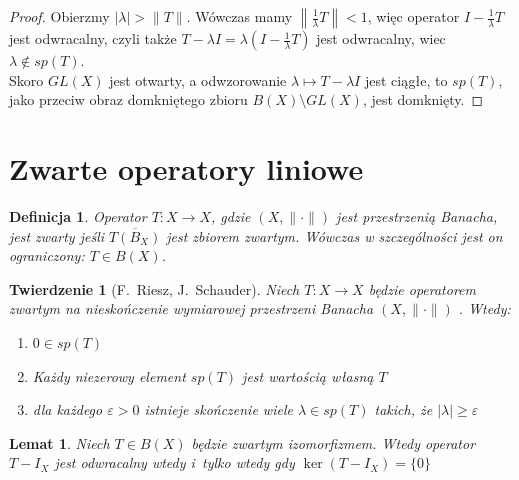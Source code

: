 \documentclass[11pt]{mwrep}
\renewcommand{\[}{\begin{equation}}
\renewcommand{\]}{\end{equation}}
\newcommand{\norm}{\|\cdot\|}
\newcommand{\spac}[1][X]{$(#1,\norm)$ }
\newtheorem{twr}[subsection]{Twierdzenie}%
\newtheorem{lem}[subsection]{Lemat}
\newtheorem{de}[subsection]{Definicja}
\newcounter{numer}
\begin{document}
\begin{proof}
	Obierzmy $|\lambda| >\|T\|$. Wówczas mamy $\left\| \frac{1}{\lambda} T\right\|<1$, więc operator  $I- \frac{1}{\lambda}T$ jest odwracalny, czyli
	także $T - \lambda I = \lambda\left( I -\frac{1}{\lambda}T \right)$ jest odwracalny, wiec $\lambda\not \in sp(T)$. \\
	Skoro $GL(X)$ jest otwarty, a odwzorowanie $\lambda \mapsto T - \lambda I$ jest ciągłe, to $sp(T)$, jako 	przeciw obraz domkniętego zbioru $B(X) \setminus GL(X)$, 
	jest domknięty.
\end{proof}
\section{Zwarte operatory liniowe}
\begin{de}
	Operator $T\colon X\to X$, gdzie \spac jest przestrzenią Banacha, jest zwarty jeśli $\overline{T(B_X)}$ jest zbiorem zwartym. Wówczas w szczególności jest on ograniczony: $T\in B(X)$.
\end{de}
\begin{twr}[F.~Riesz, J.~Schauder]
	Niech $T\colon X \to X$ będzie operatorem zwartym na nieskończenie wymiarowej przestrzeni Banacha \spac. Wtedy:
	\begin{enumerate}
		\item $0\in sp(T)$
		\item Każdy niezerowy element $sp(T)$ jest wartością własną $T$ 
	\item dla każdego $\varepsilon>0$ istnieje  skończenie wiele $\lambda \in sp(T)$ takich, że $|\lambda|\ge\varepsilon$ 
	\end{enumerate}
\end{twr}
\begin{lem}
	\label{lem:173}
	Niech $T\in B(X)$ będzie zwartym izomorfizmem. Wtedy operator $T-I_X$ jest odwracalny wtedy i~tylko wtedy gdy $\ker (T-I_X) =\{0\}$ 
\end{lem}
\end{document}
